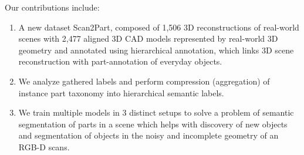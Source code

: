 
%

Our contributions include: 
\begin{enumerate}
\item A new dataset Scan2Part, composed of 1,506 3D reconstructions of real-world scenes with 2,477 aligned 3D CAD models represented by real-world 3D geometry and annotated using hierarchical annotation, which links 3D scene reconstruction with part-annotation of everyday objects.
\item We analyze gathered labels and perform compression (aggregation) of instance part taxonomy into hierarchical semantic labels. %
\item We train multiple models in 3 distinct setups to solve a problem of semantic segmentation of parts in a scene which helps with discovery of new objects and segmentation of objects in the noisy and incomplete geometry of an RGB-D scans. 
\end{enumerate}



